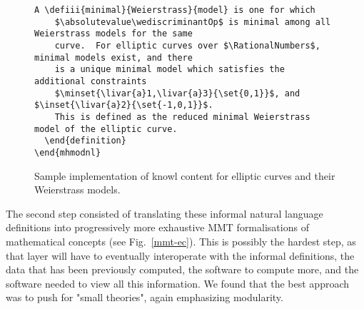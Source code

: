 \begin{figure}
\begin{lstlisting}[language={[sTeX]TeX}]
    A \defiii{minimal}{Weierstrass}{model} is one for which
    $\absolutevalue\wediscriminantOp$ is minimal among all Weierstrass models for the same
    curve.  For elliptic curves over $\RationalNumbers$, minimal models exist, and there
    is a unique minimal model which satisfies the additional constraints
    $\minset{\livar{a}1,\livar{a}3}{\set{0,1}}$, and $\inset{\livar{a}2}{\set{-1,0,1}}$. 
    This is defined as the reduced minimal Weierstrass model of the elliptic curve.
  \end{definition}
\end{mhmodnl}
\end{lstlisting}
  \caption{Sample \protect\stex implementation of \LMFDB knowl content for elliptic curves
    and their Weierstrass models.}\label{stex-ec}
\end{figure}

The second step consisted of translating these informal natural language definitions into progressively more exhaustive MMT formalisations of mathematical concepts (see Fig.~\ref{mmt-ec}). This is possibly the hardest step, as that layer will have to eventually interoperate with the informal \stex definitions, the data that has been previously computed, the software to compute more, and the software needed to view all this information. We found that the best approach was to push for "small theories", again emphasizing modularity. 







